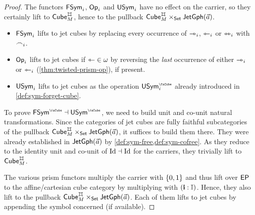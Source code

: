 \documentclass[a4paper]{memoir}
\begin{document}
\begin{proof}
	The functors $\mathsf{FSym}_i$, ${\mathsf{Op}}_i$ and $\mathsf{USym}_i$ have no effect on the carrier, so they certainly lift to $\cubecat_M^\mycubex$, hence to the pullback $\cubecat_M^\mycubex \times_\Set \jetgph{\vec a}$.
	\begin{itemize}
		\item $\mathsf{FSym}_i$ lifts to jet cubes by replacing every occurrence of $\rightarrowtriangle_i$, $\leftarrowtriangle_i$ or $\leftrightarrowtriangle_i$ with $\frown_i$.
		\item ${\mathsf{Op}}_i$ lifts to jet cubes if ${\leftarrowtriangle} \in \omega$ by reversing the \emph{last} occurrence of either $\rightarrowtriangle_i$ or $\leftarrowtriangle_i$ (\cref{thm:twisted-prism-op}), if present.
		\item $\mathsf{USym}_i$ lifts to jet cubes as the operation $\Usymcube_i$ already introduced in \cref{def:sym-forget-cube}.
	\end{itemize}
	To prove $\Fsymcube \dashv \Usymcube$, we need to build unit and co-unit natural transformations.
	Since the categories of jet cubes are fully faithful subcategories of the pullback $\cubecat_M^\mycubex \times_\Set \jetgph{\vec a}$, it suffices to build them there.
	They were already established in $\mathsf{JetGph}(\vec a)$ by \cref{def:sym-free,def:sym-cofree}.
	As they reduce to the identity unit and co-unit of $\mathrm{Id} \dashv \mathrm{Id}$ for the carriers, they trivially lift to $\cubecat_M^\mycubex$.
	
	The various prism functors multiply the carrier with $\mathopen{}\left\{ 0, 1 \right\}\mathclose{}$ and thus lift over $\mathsf{EP}$ to the affine/cartesian cube category by multiplying with $(\mathbf{i} : {\mathbb I})$.
	Hence, they also lift to the pullback $\cubecat_M^\mycubex \times_\Set \jetgph{\vec a}$.
	Each of them lifts to jet cubes by appending the symbol concerned (if available).
\end{proof}
\end{document}
